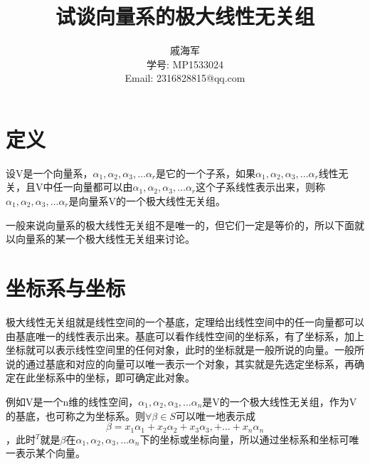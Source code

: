 \documentclass[a4paper, 12pt]{article}
\title{试谈向量系的极大线性无关组}
\author{戚海军 \\学号: MP1533024 \\Email: 2316828815@qq.com}
\date{}
\begin{document}
\maketitle

\section{定义}
设V是一个向量系，\begin{math}\alpha_{1},\alpha_{2},\alpha_{3},\ldots\alpha_{r}\end{math}是它的一个子系，如果\begin{math}\alpha_{1},\alpha_{2},\alpha_{3},\ldots\alpha_{r}\end{math}线性无关，且V中任一向量都可以由\begin{math}\alpha_{1},\alpha_{2},\alpha_{3},\ldots\alpha_{r}\end{math}这个子系线性表示出来，则称\begin{math}\alpha_{1},\alpha_{2},\alpha_{3},\ldots\alpha_{r}\end{math}是向量系V的一个极大线性无关组。

一般来说向量系的极大线性无关组不是唯一的，但它们一定是等价的，所以下面就以向量系的某一个极大线性无关组来讨论。
\section{坐标系与坐标}
极大线性无关组就是线性空间的一个基底，定理给出线性空间中的任一向量都可以由基底唯一的线性表示出来。基底可以看作线性空间的坐标系，有了坐标系，加上坐标就可以表示线性空间里的任何对象，此时的坐标就是一般所说的向量。一般所说的通过基底和对应的向量可以唯一表示一个对象，其实就是先选定坐标系，再确定在此坐标系中的坐标，即可确定此对象。

例如V是一个n维的线性空间，\begin{math}\alpha_{1},\alpha_{2},\alpha_{3},\ldots\alpha_{n}\end{math}是V的一个极大线性无关组，作为V的基底，也可称之为坐标系。则\begin{math}\forall\beta\in S\end{math}可以唯一地表示成\begin{displaymath}\beta = x_{1}\alpha_{1}+x_{2}\alpha_{2}+x_{3}\alpha_{3},+\ldots +x_{n}\alpha_{n}\end{displaymath}，此时\begin{math}[x_{1},x_{2},x_{3},\ldots x_{n}]^T\end{math}就是\begin{math}\beta\end{math}在\begin{math}\alpha_{1},\alpha_{2},\alpha_{3},…\alpha_{n}\end{math}下的坐标或坐标向量，所以通过坐标系和坐标可唯一表示某个向量。
\end{document}
